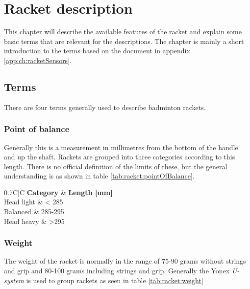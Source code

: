 \chapter{Racket description}
This chapter will describe the available features of the racket and explain some basic terms that are relevant for the descriptions.
The chapter is mainly a short introduction to the terms based on the document in appendix \ref{app:ch:racketSensors}.

\section{Terms}
There are four terms generally used to describe badminton rackets.

\subsection*{Point of balance}
Generally this is a measurement in millimetres from the bottom of the handle and up the shaft.
Rackets are grouped into three categories according to this length.
There is no official definition of the limits of these, but the general understanding is as shown in table \ref{tab:racket:pointOfBalance}.

\begin{table}
	\begin{center}
		\begin{tabularx}{0.7\textwidth}{C|C}
			\textbf{Category} & \textbf{Length [mm]} \\
			\hline
			Head light        & < 285                \\
			Balanced          & 285-295              \\
			Head heavy        & >295                 \\
		\end{tabularx}
	\end{center}
    \caption{Categorization of a racket's point of balance}
    \label{tab:racket:pointOfBalance}
\end{table}

\subsection*{Weight}
The weight of the racket is normally in the range of 75-90 grams without strings and grip and 80-100 grams including strings and grip.
Generally the Yonex \textit{U-system} is used to group rackets as seen in table \ref{tab:racket:weight}

